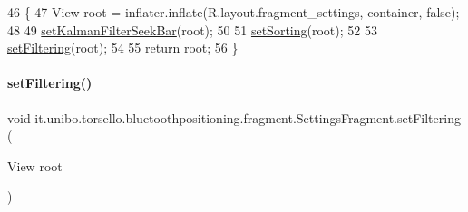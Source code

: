 \begin{DoxyCode}
46                                                                                                       \{
47         View root = inflater.inflate(R.layout.fragment\_settings, container, \textcolor{keyword}{false});
48 
49         \hyperlink{classit_1_1unibo_1_1torsello_1_1bluetoothpositioning_1_1fragment_1_1SettingsFragment_a84057f1633708ec85de5968ed9e7f032_a84057f1633708ec85de5968ed9e7f032}{setKalmanFilterSeekBar}(root);
50 
51         \hyperlink{classit_1_1unibo_1_1torsello_1_1bluetoothpositioning_1_1fragment_1_1SettingsFragment_ae29f0b3d6fc60f1ceeab5dcc530166c1_ae29f0b3d6fc60f1ceeab5dcc530166c1}{setSorting}(root);
52 
53         \hyperlink{classit_1_1unibo_1_1torsello_1_1bluetoothpositioning_1_1fragment_1_1SettingsFragment_a0d7b911602439aaf2a9ee4d5f9e41088_a0d7b911602439aaf2a9ee4d5f9e41088}{setFiltering}(root);
54 
55         \textcolor{keywordflow}{return} root;
56     \}
\end{DoxyCode}
\hypertarget{classit_1_1unibo_1_1torsello_1_1bluetoothpositioning_1_1fragment_1_1SettingsFragment_a0d7b911602439aaf2a9ee4d5f9e41088_a0d7b911602439aaf2a9ee4d5f9e41088}{}\label{classit_1_1unibo_1_1torsello_1_1bluetoothpositioning_1_1fragment_1_1SettingsFragment_a0d7b911602439aaf2a9ee4d5f9e41088_a0d7b911602439aaf2a9ee4d5f9e41088} 
\paragraph{\texorpdfstring{set\+Filtering()}{setFiltering()}}
{\footnotesize\ttfamily void it.\+unibo.\+torsello.\+bluetoothpositioning.\+fragment.\+Settings\+Fragment.\+set\+Filtering (\begin{DoxyParamCaption}\item[{View}]{root }\end{DoxyParamCaption})\hspace{0.3cm}{\ttfamily [private]}}


